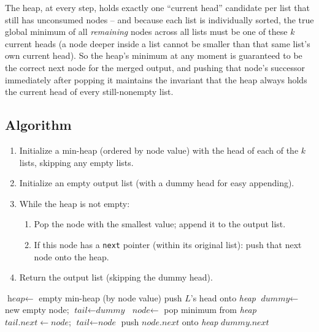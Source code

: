 The heap, at every step, holds exactly one ``current head'' candidate per
list that still has unconsumed nodes -- and because each list is
individually sorted, the true global minimum of all \emph{remaining}
nodes across all lists must be one of these $k$ current heads (a node
deeper inside a list cannot be smaller than that same list's own current
head). So the heap's minimum at any moment is guaranteed to be the correct
next node for the merged output, and pushing that node's successor
immediately after popping it maintains the invariant that the heap always
holds the current head of every still-nonempty list.

\subsection*{Algorithm}

\begin{enumerate}
  \item Initialize a min-heap (ordered by node value) with the head of
        each of the $k$ lists, skipping any empty lists.
  \item Initialize an empty output list (with a dummy head for easy
        appending).
  \item While the heap is not empty:
  \begin{enumerate}
    \item Pop the node with the smallest value; append it to the output
          list.
    \item If this node has a \texttt{next} pointer (within its original
          list): push that next node onto the heap.
  \end{enumerate}
  \item Return the output list (skipping the dummy head).
\end{enumerate}

\begin{algorithm}[H]
\caption{Merge K Sorted Lists}
\begin{algorithmic}[1]
  \State $\textit{heap} \gets$ empty min-heap (by node value)
     push $L$'s head onto \textit{heap} \EndIf
  \EndFor
  \State $\textit{dummy} \gets$ new empty node; $\textit{tail} \gets \textit{dummy}$
    \State $\textit{node} \gets$ pop minimum from \textit{heap}
    \State $\textit{tail}.\textit{next} \gets \textit{node}$; $\textit{tail} \gets \textit{node}$
      \State push $\textit{node}.\textit{next}$ onto \textit{heap}
    \EndIf
  \EndWhile
  \State \Return $\textit{dummy}.\textit{next}$
\EndProcedure
\end{algorithmic}
\end{algorithm}

